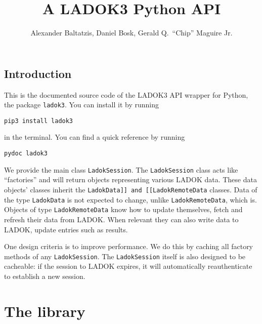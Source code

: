 \documentclass[a4paper]{report}
\title{%
  A LADOK3 Python API
}
\author{%
  Alexander Baltatzis,
  Daniel Bosk,
  Gerald Q.\ \enquote{Chip} Maguire Jr.
}
\affil{%
  KTH EECS\\
  \texttt{\{alba,dbosk,maguire\}@kth.se}
}
\begin{document}
\maketitle

\vspace*{\fill}
\clearpage

\begin{abstract}
  
\end{abstract}
\clearpage

\tableofcontents
\clearpage


\chapter{Introduction}

This is the documented source code of the LADOK3 API wrapper for Python, the 
package \texttt{ladok3}.
You can install it by running
\begin{verbatim}
pip3 install ladok3
\end{verbatim}
in the terminal.
You can find a quick reference by running
\begin{verbatim}
pydoc ladok3
\end{verbatim}

We provide the main class \texttt{LadokSession}.
The \texttt{LadokSession} class acts like \enquote{factories} and will return 
objects representing various LADOK data.
These data objects' classes inherit the \texttt{LadokData]] and [[LadokRemoteData} 
classes.
Data of the type \texttt{LadokData} is not expected to change, unlike 
\texttt{LadokRemoteData}, which is.
Objects of type \texttt{LadokRemoteData} know how to update themselves, \ie fetch 
and refresh their data from LADOK.
When relevant they can also write data to LADOK, \ie update entries such as 
results.

One design criteria is to improve performance.
We do this by caching all factory methods of any \texttt{LadokSession}.
The \texttt{LadokSession} itself is also designed to be cacheable: if the session to 
LADOK expires, it will automatically reauthenticate to establish a new session.



\part{The library}


\end{document}

